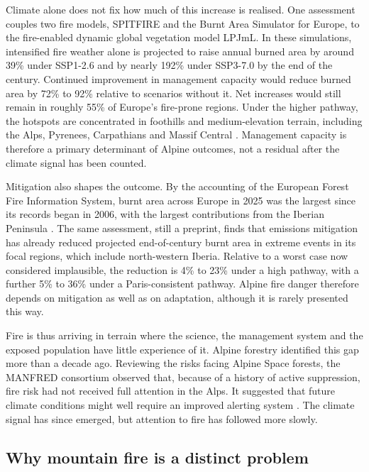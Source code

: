\documentclass[11pt,a4paper]{article}
\begin{document}
Climate alone does not fix how much of this increase is realised. One assessment couples two fire models, SPITFIRE and the Burnt Area Simulator for Europe, to the fire-enabled dynamic global vegetation model LPJmL. In these simulations, intensified fire weather alone is projected to raise annual burned area by around 39\% under SSP1-2.6 and by nearly 192\% under SSP3-7.0 by the end of the century. Continued improvement in management capacity would reduce burned area by 72\% to 92\% relative to scenarios without it. Net increases would still remain in roughly 55\% of Europe's fire-prone regions. Under the higher pathway, the hotspots are concentrated in foothills and medium-elevation terrain, including the Alps, Pyrenees, Carpathians and Massif Central \citep{billing_future_2026}. Management capacity is therefore a primary determinant of Alpine outcomes, not a residual after the climate signal has been counted.

Mitigation also shapes the outcome. By the accounting of the European Forest Fire Information System, burnt area across Europe in 2025 was the largest since its records began in 2006, with the largest contributions from the Iberian Peninsula \citep{burton_state_2026}. The same assessment, still a preprint, finds that emissions mitigation has already reduced projected end-of-century burnt area in extreme events in its focal regions, which include north-western Iberia. Relative to a worst case now considered implausible, the reduction is 4\% to 23\% under a high pathway, with a further 5\% to 36\% under a Paris-consistent pathway. Alpine fire danger therefore depends on mitigation as well as on adaptation, although it is rarely presented this way.

Fire is thus arriving in terrain where the science, the management system and the exposed population have little experience of it. Alpine forestry identified this gap more than a decade ago. Reviewing the risks facing Alpine Space forests, the MANFRED consortium observed that, because of a history of active suppression, fire risk had not received full attention in the Alps. It suggested that future climate conditions might well require an improved alerting system \citep{jandl_management_2013}. The climate signal has since emerged, but attention to fire has followed more slowly.

\subsection{Why mountain fire is a distinct problem}
\end{document}
